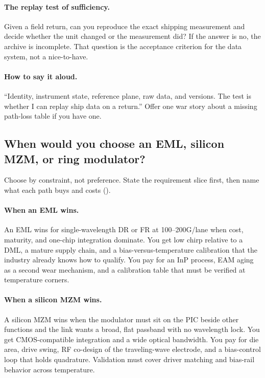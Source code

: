 \paragraph{The replay test of sufficiency.}
Given a field return, can you reproduce the exact shipping measurement and
decide whether the unit changed or the measurement did? If the answer is no,
the archive is incomplete. That question is the acceptance criterion for the
data system, not a nice-to-have.

\paragraph{How to say it aloud.}
``Identity, instrument state, reference plane, raw data, and versions. The
test is whether I can replay ship data on a return.'' Offer one war story
about a missing path-loss table if you have one.

\subsection{When would you choose an EML, silicon MZM, or ring modulator?}
\label{sec:interview-worked-modulator}

Choose by constraint, not preference. State the requirement slice first,
then name what each path buys and costs
().

\paragraph{When an EML wins.}
An EML wins for single-wavelength DR or
FR at 100--200G/lane when cost, maturity, and one-chip
integration dominate. You get low chirp relative to a DML, a
mature supply chain, and a bias-versus-temperature calibration that the
industry already knows how to qualify. You pay for an InP
process, EAM aging as a second wear mechanism, and a
calibration table that must be verified at temperature corners.

\paragraph{When a silicon MZM wins.}
A silicon MZM wins when the modulator must sit on the
PIC beside other functions and the link wants a broad, flat
passband with no wavelength lock. You get CMOS-compatible
integration and a wide optical bandwidth. You pay for die area, drive swing,
RF co-design of the traveling-wave electrode, and a bias-control loop that
holds quadrature. Validation must cover driver matching and bias-rail
behavior across temperature.

